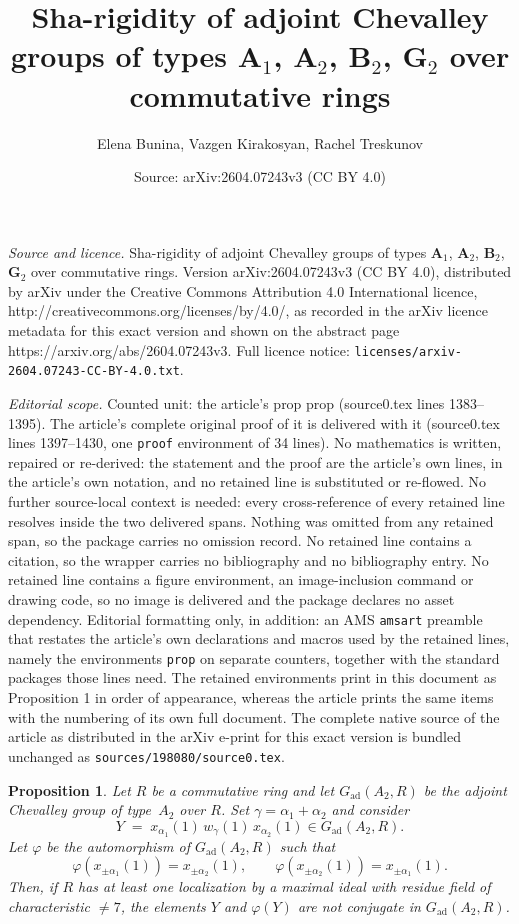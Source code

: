 \documentclass[10pt,a4paper]{amsart}
\title{Sha-rigidity of adjoint Chevalley groups of types $\mathbf A_1$, $\mathbf A_2$, $\mathbf B_2$, $\mathbf G_2$ over commutative rings}
\author{Elena Bunina, Vazgen Kirakosyan, Rachel Treskunov}
\date{Source: arXiv:2604.07243v3 (CC BY 4.0)}
\newtheorem{prop}{Proposition}
\begin{document}
\maketitle

\noindent\emph{Source and licence.} Sha-rigidity of adjoint Chevalley groups of types $\mathbf A_1$, $\mathbf A_2$, $\mathbf B_2$, $\mathbf G_2$ over commutative rings. Version arXiv:2604.07243v3 (CC BY 4.0), distributed by arXiv under the Creative Commons Attribution 4.0 International licence, http://creativecommons.org/licenses/by/4.0/, as recorded in the arXiv licence metadata for this exact version and shown on the abstract page https://arxiv.org/abs/2604.07243v3. Full licence notice: \texttt{licenses/arxiv-2604.07243-CC-BY-4.0.txt}.\par\smallskip

\noindent\textit{Editorial scope.} Counted unit: the article's prop prop (source0.tex lines 1383--1395). The article's complete original proof of it is delivered with it (source0.tex lines 1397--1430, one \texttt{proof} environment of 34 lines). No mathematics is written, repaired or re-derived: the statement and the proof are the article's own lines, in the article's own notation, and no retained line is substituted or re-flowed.  No further source-local context is needed: every cross-reference of every retained line resolves inside the two delivered spans.  Nothing was omitted from any retained span, so the package carries no omission record.  No retained line contains a citation, so the wrapper carries no bibliography and no bibliography entry.  No retained line contains a figure environment, an image-inclusion command or drawing code, so no image is delivered and the package declares no asset dependency.  Editorial formatting only, in addition: an AMS \texttt{amsart} preamble that restates the article's own declarations and macros used by the retained lines, namely the environments \texttt{prop} on separate counters, together with the standard packages those lines need.  The retained environments print in this document as Proposition 1 in order of appearance, whereas the article prints the same items with the numbering of its own full document.  The complete native source of the article as distributed in the arXiv e-print for this exact version is bundled unchanged as \texttt{sources/198080/source0.tex}.
\begin{prop}
Let $R$ be a commutative ring and let $G_{\mathrm{ad}}(A_2,R)$ be the adjoint Chevalley group of type~$A_2$ over $R$.
Set $\gamma=\alpha_1+\alpha_2$ and consider
\[
Y \;=\; x_{\alpha_1}(1)\,w_\gamma(1)\,x_{\alpha_2}(1)\in G_{\mathrm{ad}}(A_2,R).
\]
Let $\varphi$ be the automorphism of $G_{\mathrm{ad}}(A_2,R)$ such that
\[
\varphi(x_{\pm \alpha_1}(1))=x_{\pm \alpha_2}(1),\qquad
\varphi(x_{\pm \alpha_2}(1))=x_{\pm \alpha_1}(1).
\]
Then, if $R$ has at least one localization by a maximal ideal with residue field of characteristic $\ne 7$, the elements $Y$ and $\varphi(Y)$ are not conjugate in $G_{\mathrm{ad}}(A_2,R)$.
\end{prop}
\end{document}
